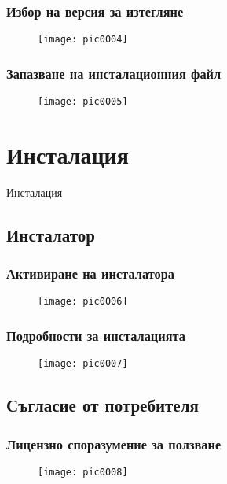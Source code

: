 \documentclass{beamer}
\begin{document}
\begin{frame}
\frametitle{Избор на версия за изтегляне}
\begin{figure}[]\texttt{[image: pic0004]}\end{figure}
\end{frame}

\begin{frame}
\frametitle{Запазване на инсталационния файл}
\begin{figure}[]\texttt{[image: pic0005]}\end{figure}
\end{frame}

\section{Инсталация}

\begin{frame}
\center \huge{Инсталация}
\end{frame}

\subsection{Инсталатор}

\begin{frame}
\frametitle{Активиране на инсталатора}
\begin{figure}[]\texttt{[image: pic0006]}\end{figure}
\end{frame}

\begin{frame}
\frametitle{Подробности за инсталацията}
\begin{figure}[]\texttt{[image: pic0007]}\end{figure}
\end{frame}

\subsection{Съгласие от потребителя}

\begin{frame}
\frametitle{Лицензно споразумение за ползване}
\begin{figure}[]\texttt{[image: pic0008]}\end{figure}
\end{frame}
\end{document}
